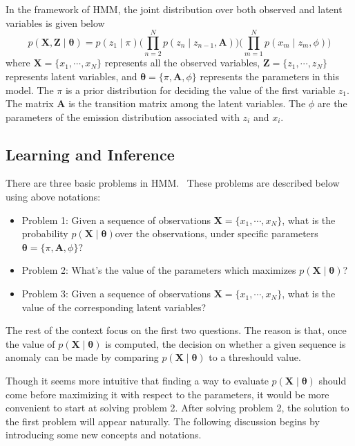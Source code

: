 In the framework of HMM, the joint distribution over both observed and latent variables is given below
\begin{equation}
	p(\mathbf{X}, \mathbf{Z} \mid \boldsymbol{\theta}) = p(z_1 \mid \pi) \big(\prod_{n=2}^{N}p(z_n\mid z_{n-1}, \mathbf{A})\big) \big(\prod_{m=1}^{N}p(x_m\mid z_m, \phi)\big)
	\label{eq:HMMcomplete}
\end{equation}
where \(\mathbf{X} = \{x_1, \cdots, x_N\}\) represents all the observed variables, \(\mathbf{Z} = \{z_1, \cdots, z_N\}\) represents latent variables, and \(\boldsymbol{\theta} = \{\pi, \mathbf{A}, \phi\}\) represents the parameters in this model. The \(\pi\) is a prior distribution for deciding the value of the first variable \(z_1\). The matrix \(\mathbf{A}\) is the transition matrix among the latent variables. The \(\phi\) are the parameters of the emission distribution associated with \(z_i\) and \(x_i\).

\subsection{Learning and Inference}
There are three basic problems in HMM.~\cite{rabiner1989tutorial}  These problems are described below using above notations:
\begin{itemize}
	\item Problem 1: Given a sequence of observations \(\mathbf{X} = \{x_1, \cdots, x_N\}\), what is the probability \(p(\mathbf{X} \mid \boldsymbol{\theta}) 			  \)over the observations, under specific parameters \(\boldsymbol{\theta} = \{\pi, \mathbf{A}, \phi\}\)?
	\item Problem 2: What's the value of the parameters which maximizes \(p(\mathbf{X} \mid \boldsymbol{\theta})\)?
	\item Problem 3: Given a sequence of observations \(\mathbf{X} = \{x_1, \cdots, x_N\}\), what is the value of the corresponding latent variables?
\end{itemize}
The rest of the context focus on the first two questions. The reason is that, once the value of \(p(\mathbf{X} \mid \boldsymbol{\theta})\) is computed, the decision on whether a given sequence is anomaly can be made by comparing \(p(\mathbf{X} \mid \boldsymbol{\theta})\) to a threshould value.

Though it seems more intuitive that finding a way to evaluate \(p(\mathbf{X} \mid \boldsymbol{\theta})\) should come before maximizing it with respect to the parameters, it would be more convenient to start at solving problem 2. After solving problem 2, the solution to the first problem will appear naturally. The following discussion begins by introducing some new concepts and notations.

